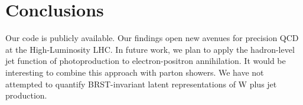 \section{Conclusions}\label{sec:conclusions}

Our code is publicly available. Our findings open new avenues for
precision QCD at the High-Luminosity LHC. In future work, we plan to
apply the hadron-level jet function of photoproduction to
electron-positron annihilation. It would be interesting to combine this
approach with parton showers. We have not attempted to quantify
BRST-invariant latent representations of W plus jet production.

